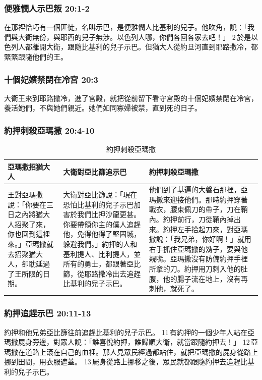 \subsubsection{便雅憫人示巴叛 20:1-2}
在那裡恰巧有一個匪徒，名叫示巴，是便雅憫人比基利的兒子。他吹角，說：「我們與大衛無份，與耶西的兒子無涉。以色列人哪，你們各回各家去吧！」 2 於是以色列人都離開大衛，跟隨比基利的兒子示巴。但猶大人從約旦河直到耶路撒冷，都緊緊跟隨他們的王。

\subsubsection{十個妃嬪禁閉在冷宮 20:3}
大衛王來到耶路撒冷，進了宮殿，就把從前留下看守宮殿的十個妃嬪禁閉在冷宮，養活她們，不與她們親近。她們如同寡婦被禁，直到死的日子。

\subsubsection{約押刺殺亞瑪撒 20:4-10}
\begin{table}[H]
\hspace*{-7mm}
\centering 
\begin{tabular}{p{3.5cm}|p{5.8cm}|p{7.83cm}}\hline\hline
亞瑪撒招猶大人&大衛對亞比篩追示巴&約押刺殺亞瑪撒\\\hline
王對亞瑪撒說：「你要在三日之內將猶大人招聚了來，你也回到這裡來。」亞瑪撒就去招聚猶大人，卻耽延過了王所限的日期。
&大衛對亞比篩說：「現在恐怕比基利的兒子示巴加害於我們比押沙龍更甚。你要帶領你主的僕人追趕他，免得他得了堅固城，躲避我們。」約押的人和基利提人、比利提人，並所有的勇士，都跟著亞比篩，從耶路撒冷出去追趕比基利的兒子示巴。
&他們到了基遍的大磐石那裡，亞瑪撒來迎接他們。那時約押穿著戰衣，腰束佩刀的帶子，刀在鞘內。約押前行，刀從鞘內掉出來。約押左手拾起刀來，對亞瑪撒說：「我兄弟，你好啊！」就用右手抓住亞瑪撒的鬍子，要與他親嘴。亞瑪撒沒有防備約押手裡所拿的刀。約押用刀刺入他的肚腹，他的腸子流在地上，沒有再刺他，就死了。
\\\hline
\end{tabular}
\caption{約押刺殺亞瑪撒}
\end{table}

\subsubsection{約押追趕示巴 20:11-13}
約押和他兄弟亞比篩往前追趕比基利的兒子示巴。 11 有約押的一個少年人站在亞瑪撒屍身旁邊，對眾人說：「誰喜悅約押，誰歸順大衛，就當跟隨約押去！」 12 亞瑪撒在道路上滾在自己的血裡。那人見眾民經過都站住，就把亞瑪撒的屍身從路上挪到田間，用衣服遮蓋。 13 屍身從路上挪移之後，眾民就都跟隨約押去追趕比基利的兒子示巴。

